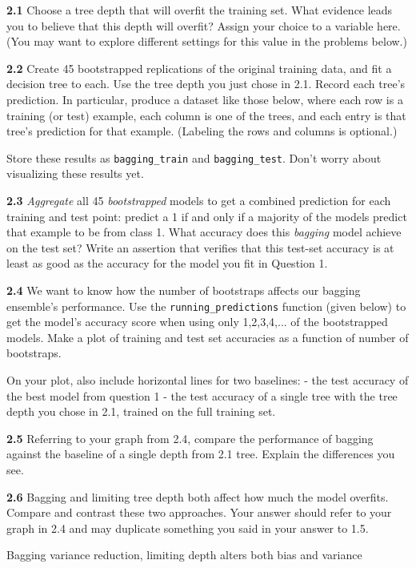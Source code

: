 \documentclass[11pt]{article}
\begin{document}
    \textbf{2.1} Choose a tree depth that will overfit the training set.
What evidence leads you to believe that this depth will overfit? Assign
your choice to a variable here. (You may want to explore different
settings for this value in the problems below.)

\textbf{2.2} Create 45 bootstrapped replications of the original
training data, and fit a decision tree to each. Use the tree depth you
just chose in 2.1. Record each tree's prediction. In particular, produce
a dataset like those below, where each row is a training (or test)
example, each column is one of the trees, and each entry is that tree's
prediction for that example. (Labeling the rows and columns is
optional.)

Store these results as \texttt{bagging\_train} and
\texttt{bagging\_test}. Don't worry about visualizing these results yet.

\textbf{2.3} \emph{Aggregate} all 45 \emph{bootstrapped} models to get a
combined prediction for each training and test point: predict a 1 if and
only if a majority of the models predict that example to be from class
1. What accuracy does this \emph{bagging} model achieve on the test set?
Write an assertion that verifies that this test-set accuracy is at least
as good as the accuracy for the model you fit in Question 1.

\textbf{2.4} We want to know how the number of bootstraps affects our
bagging ensemble's performance. Use the \texttt{running\_predictions}
function (given below) to get the model's accuracy score when using only
1,2,3,4,... of the bootstrapped models. Make a plot of training and test
set accuracies as a function of number of bootstraps.

On your plot, also include horizontal lines for two baselines: - the
test accuracy of the best model from question 1 - the test accuracy of a
single tree with the tree depth you chose in 2.1, trained on the full
training set.

\textbf{2.5} Referring to your graph from 2.4, compare the performance
of bagging against the baseline of a single depth from 2.1 tree. Explain
the differences you see.

\textbf{2.6} Bagging and limiting tree depth both affect how much the
model overfits. Compare and contrast these two approaches. Your answer
should refer to your graph in 2.4 and may duplicate something you said
in your answer to 1.5.

Bagging variance reduction, limiting depth alters both bias and variance
\end{document}
